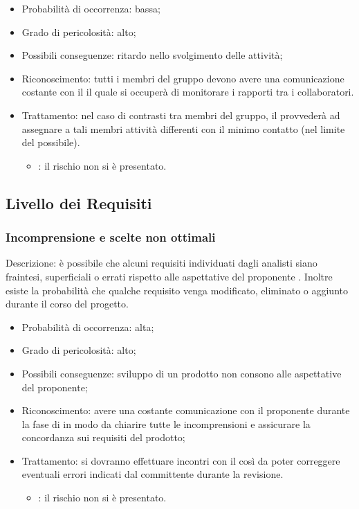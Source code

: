 \documentclass[PianoDiProgetto.tex]{subfiles}
\begin{document}
	\begin{itemize}
		\item Probabilità di occorrenza: bassa;
		\item Grado di pericolosità: alto;
		\item Possibili conseguenze: ritardo nello svolgimento delle attività;
		\item Riconoscimento: tutti i membri del gruppo devono avere una comunicazione costante con il \RESP{} il quale si occuperà di monitorare i rapporti tra i collaboratori.
		\item Trattamento: nel caso di contrasti tra membri del gruppo, il \RESP{} provvederà ad assegnare a tali membri attività differenti con il minimo contatto (nel limite del possibile).
		\begin{itemize}
				\item \ARdoc : il rischio non si è presentato.
		\end{itemize}
	\end{itemize}
	
	\subsection{Livello dei Requisiti}
		\subsubsection{Incomprensione e scelte non ottimali}
Descrizione: è possibile che alcuni requisiti individuati dagli analisti siano fraintesi, superficiali o errati rispetto alle aspettative del proponente \PROPONENTE{}. Inoltre esiste la probabilità che qualche requisito venga modificato, eliminato o aggiunto durante il corso del progetto.

		\begin{itemize}
		\item Probabilità di occorrenza: alta;
		\item Grado di pericolosità: alto;
		\item Possibili conseguenze: sviluppo di un prodotto non consono alle aspettative del proponente;
		\item Riconoscimento: avere una costante comunicazione con il proponente \PROPONENTE{} durante la fase di \ARdoc{} in modo da chiarire tutte le incomprensioni e assicurare la concordanza sui requisiti del prodotto;
		\item Trattamento: si dovranno effettuare incontri con il \PROPONENTE{} così da poter correggere eventuali errori indicati dal committente durante la revisione.
		\begin{itemize}
				\item \ARdoc : il rischio non si è presentato.
		\end{itemize}
	\end{itemize}	
	
\end{document}
